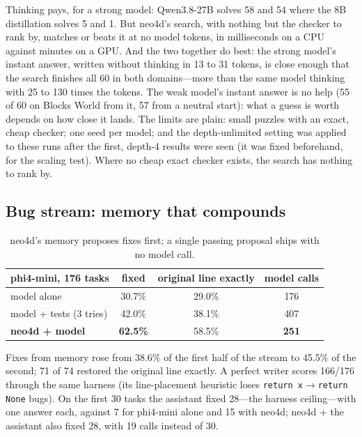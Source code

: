 \documentclass[10pt]{article}
\begin{document}
Thinking pays, for a strong model: Qwen3.8-27B solves 58 and 54 where the 8B distillation solves 5 and 1. But neo4d's
search, with nothing but the checker to rank by, matches or beats it at no model tokens, in milliseconds on a CPU
against minutes on a GPU. And the two together do best: the strong model's instant answer, written without thinking in
13 to 31 tokens, is close enough that the search finishes all 60 in both domains---more than the same model thinking
with 25 to 130 times the tokens. The weak model's instant answer is no help (55 of 60 on Blocks World from it, 57 from a
neutral start): what a guess is worth depends on how close it lands. The limits are plain: small puzzles with an exact,
cheap checker; one seed per model; and the depth-unlimited setting was applied to these runs after the first, depth-4
results were seen (it was fixed beforehand, for the scaling test). Where no cheap exact checker exists, the search has
nothing to rank by.

\subsection{Bug stream: memory that compounds}
\begin{table}[H]
\centering\small
\begin{tabular}{lccc}
\toprule
phi4-mini, 176 tasks & fixed & original line exactly & model calls\\
\midrule
model alone & 30.7\% & 29.0\% & 176\\
model + tests (3 tries) & 42.0\% & 38.1\% & 407\\
\textbf{neo4d + model} & \textbf{62.5\%} & 58.5\% & \textbf{251}\\
\bottomrule
\end{tabular}
\caption{neo4d's memory proposes fixes first; a single passing proposal ships with no model call.}
\end{table}
Fixes from memory rose from 38.6\% of the first half of the stream to 45.5\% of the second; 71 of 74 restored the
original line exactly. A perfect writer scores 166/176 through the same harness (its line-placement heuristic loses
\texttt{return x}$\to$\texttt{return None} bugs). On the first 30 tasks the assistant fixed 28---the harness
ceiling---with one answer each, against 7 for phi4-mini alone and 15 with neo4d; neo4d + the assistant also fixed 28,
with 19 calls instead of 30.
\end{document}
